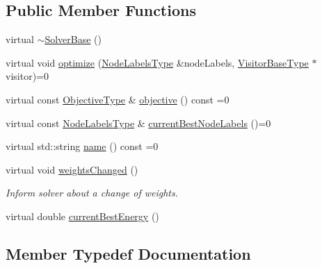 \subsection*{Public Member Functions}
\begin{DoxyCompactItemize}
\item 
virtual \hyperlink{classnifty_1_1graph_1_1opt_1_1common_1_1SolverBase_a2a5a231352b9e37b2be4a4d7e05a515d}{$\sim$\+Solver\+Base} ()
\item 
virtual void \hyperlink{classnifty_1_1graph_1_1opt_1_1common_1_1SolverBase_a3d877f6a2b3b68cde5cfc73e427e3c6f}{optimize} (\hyperlink{classnifty_1_1graph_1_1opt_1_1common_1_1SolverBase_abefd51561de2fd009f6bed6bef6009ea}{Node\+Labels\+Type} \&node\+Labels, \hyperlink{classnifty_1_1graph_1_1opt_1_1common_1_1SolverBase_ad9932afb08dd17d375de4b15da9ffaa6}{Visitor\+Base\+Type} $\ast$visitor)=0
\item 
virtual const \hyperlink{classnifty_1_1graph_1_1opt_1_1common_1_1SolverBase_aac4861a6201ba3df7ef66ad5af0c65bd}{Objective\+Type} \& \hyperlink{classnifty_1_1graph_1_1opt_1_1common_1_1SolverBase_a55e9eb645c07d6e0782ebfb990ab3c84}{objective} () const =0
\item 
virtual const \hyperlink{classnifty_1_1graph_1_1opt_1_1common_1_1SolverBase_abefd51561de2fd009f6bed6bef6009ea}{Node\+Labels\+Type} \& \hyperlink{classnifty_1_1graph_1_1opt_1_1common_1_1SolverBase_a7bbe01ee201cf3157b251e54c5ff0619}{current\+Best\+Node\+Labels} ()=0
\item 
virtual std\+::string \hyperlink{classnifty_1_1graph_1_1opt_1_1common_1_1SolverBase_af638b9a804cfec3e35fe87c77e942d30}{name} () const =0
\item 
virtual void \hyperlink{classnifty_1_1graph_1_1opt_1_1common_1_1SolverBase_a6a5d77ee514c4b5f44d1908c1000f0ff}{weights\+Changed} ()
\begin{DoxyCompactList}\small\item\em Inform solver about a change of weights. \end{DoxyCompactList}\item 
virtual double \hyperlink{classnifty_1_1graph_1_1opt_1_1common_1_1SolverBase_a871de6574e6189a0c97c0b2121b07155}{current\+Best\+Energy} ()
\end{DoxyCompactItemize}


\subsection{Member Typedef Documentation}
\mbox{\label{classnifty_1_1graph_1_1opt_1_1common_1_1SolverBase_abd7237c59d5ba5bf2d4c9c0eca8a248b}} 
